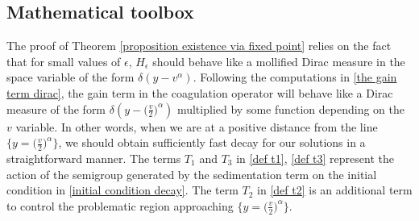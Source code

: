 \documentclass[11pt]{article}
\numberwithin{equation}{section}
\begin{document}
 
 

 \subsection{Mathematical toolbox}
The proof of Theorem \ref{proposition existence via fixed point} relies on the fact that for small values of $\epsilon$, $H_{\epsilon}$ should behave like a mollified Dirac measure in the space variable of the form $\delta(y-v^{\alpha})$. Following the computations in \eqref{the gain term dirac}, the gain term in the coagulation operator will behave like a Dirac measure 
of the form $\delta(y-\big(\frac{v}{2}\big)^{\alpha})$ multiplied by some function depending on the $v$ variable. In other words, when we are at a positive distance from the line $\{y=\big(\frac{v}{2}\big)^{\alpha}\}$, we should obtain sufficiently fast decay for our solutions in a straightforward manner.  The terms $T_{1}$ and $T_{3}$ in \eqref{def t1}, \eqref{def t3} represent the action of the semigroup generated by the sedimentation term on the initial condition in \eqref{initial condition decay}.  The term $T_{2}$ in \eqref{def t2} is an additional term to control the problematic region approaching $\{y=\big(\frac{v}{2}\big)^{\alpha}\}$.
\end{document}
